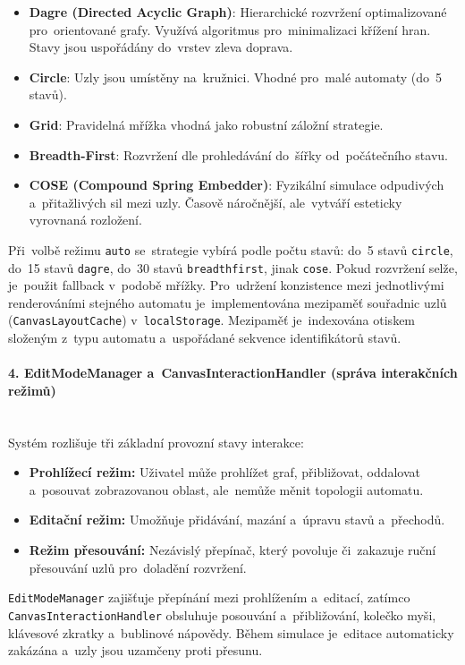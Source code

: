\documentclass[
  master,
  program=ainfvs,
  printversion,
  figures=false,
  tables=false,
  glossaries,
  index
]{kidiplom}
\begin{document}
\begin{itemize}
    \item \textbf{Dagre (Directed Acyclic Graph)}: Hierarchické rozvržení optimalizované pro~orientované grafy. Využívá algoritmus pro~minimalizaci křížení hran. Stavy jsou uspořádány do~vrstev zleva doprava.
    \item \textbf{Circle}: Uzly jsou umístěny na~kružnici. Vhodné pro~malé automaty (do~5 stavů).
    \item \textbf{Grid}: Pravidelná mřížka vhodná jako robustní záložní strategie.
    \item \textbf{Breadth-First}: Rozvržení dle prohledávání do~šířky od~počátečního stavu.
    \item \textbf{COSE (Compound Spring Embedder)}: Fyzikální simulace odpudivých a~přitažlivých sil mezi uzly. Časově náročnější, ale~vytváří esteticky vyrovnaná rozložení.
\end{itemize}

Při~volbě režimu \texttt{auto} se~strategie vybírá podle počtu stavů: do~5 stavů \texttt{circle}, do~15 stavů \texttt{dagre}, do~30 stavů \texttt{breadthfirst}, jinak \texttt{cose}. Pokud rozvržení selže, je~použit fallback v~podobě mřížky. Pro~udržení konzistence mezi jednotlivými renderováními stejného automatu je~implementována mezipaměť souřadnic uzlů (\texttt{CanvasLayoutCache}) v~\texttt{localStorage}. Mezipaměť je~indexována otiskem složeným z~typu automatu a~uspořádané sekvence identifikátorů stavů.

\paragraph{4. EditModeManager a~CanvasInteractionHandler (správa interakčních režimů)} \mbox{} \\
Systém rozlišuje tři základní provozní stavy interakce:
\begin{itemize}
    \item \textbf{Prohlížecí režim:} Uživatel může prohlížet graf, přibližovat, oddalovat a~posouvat zobrazovanou oblast, ale~nemůže měnit topologii automatu.
    \item \textbf{Editační režim:} Umožňuje přidávání, mazání a~úpravu stavů a~přechodů.
    \item \textbf{Režim přesouvání:} Nezávislý přepínač, který povoluje či~zakazuje ruční přesouvání uzlů pro~doladění rozvržení.
\end{itemize}

\texttt{EditModeManager} zajišťuje přepínání mezi prohlížením a~editací, zatímco \texttt{CanvasInteractionHandler} obsluhuje posouvání a~přibližování, kolečko myši, klávesové zkratky a~bublinové nápovědy. Během simulace je~editace automaticky zakázána a~uzly jsou uzamčeny proti přesunu.
\end{document}
